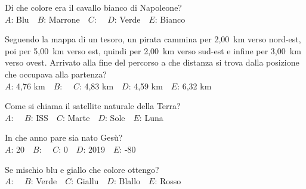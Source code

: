 \mcquestionheader Di che colore era il cavallo bianco di Napoleone?\\
{$A$}: Blu\ \ {$B$}: Marrone\ \ {$C$}: \ \ {$D$}: Verde\ \ {$E$}: Bianco\ \ 

\mcquestionfooter



\def\mcquestionnumber{3}


\mcquestionheader Seguendo la mappa di un tesoro, un pirata cammina per 2,00~km verso nord-est, poi per 5,00~km verso est, quindi per 2,00~km verso sud-est e infine per 3,00~km verso ovest. Arrivato alla fine del percorso a che distanza si trova dalla posizione che occupava alla partenza?\\
{$A$}: 4,76 km\ \ {$B$}: \ \ {$C$}: 4,83 km\ \ {$D$}: 4,59 km\ \ {$E$}: 6,32 km\ \ 

\mcquestionfooter



\def\mcquestionnumber{4}


\mcquestionheader Come si chiama il satellite naturale della Terra?\\
{$A$}: \ \ {$B$}: ISS\ \ {$C$}: Marte\ \ {$D$}: Sole\ \ {$E$}: Luna\ \ 

\mcquestionfooter



\def\mcquestionnumber{5}


\mcquestionheader In che anno pare sia nato Gesù?\\
{$A$}: 20\ \ {$B$}: \ \ {$C$}: 0\ \ {$D$}: 2019\ \ {$E$}: -80\ \ 

\mcquestionfooter



\def\mcquestionnumber{6}


\mcquestionheader Se mischio blu e giallo che colore ottengo?\\
{$A$}: \ \ {$B$}: Verde\ \ {$C$}: Giallu\ \ {$D$}: Blallo\ \ {$E$}: Rosso\ \ 

\mcquestionfooter



\def\mcquestionnumber{7}


